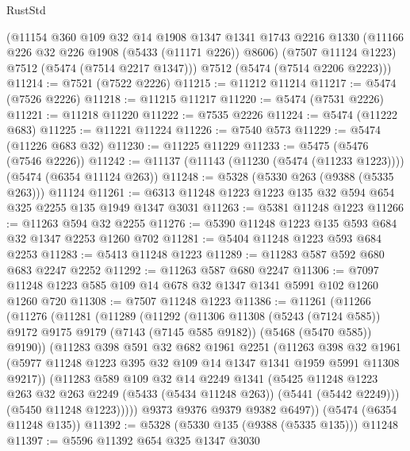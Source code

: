 \begin{lexlean}{RustStd}
\begin{coremodule}
      (@11154
        @360
        @109
        @32
        @14
        @1908
        @1347
        @1341
        @1743
        @2216
        @1330
        (@11166 @226 @32 @226 @1908 (@5433 (@11171 @226)) @8606)
        (@7507 @11124 @1223)
        @7512
        (@5474 (@7514 @2217 @1347)))
      @7512
      (@5474 (@7514 @2206 @2223)))
@11214 := @7521 (@7522 @2226)
@11215 := @11212 @11214
@11217 := @5474 (@7526 @2226)
@11218 := @11215 @11217
@11220 := @5474 (@7531 @2226)
@11221 := @11218 @11220
@11222 := @7535 @2226
@11224 := @5474 (@11222 @683)
@11225 := @11221 @11224
@11226 := @7540 @573
@11229 := @5474 (@11226 @683 @32)
@11230 := @11225 @11229
@11233 := @5475 (@5476 (@7546 @2226))
@11242 := @11137 (@11143 (@11230 (@5474 (@11233 @1223)))) (@5474 (@6354 @11124 @263))
@11248 := @5328 (@5330 @263 (@9388 (@5335 @263))) @11124
@11261 := @6313 @11248 @1223 @1223 @135 @32 @594 @654 @325 @2255 @135 @1949 @1347 @3031
@11263 := @5381 @11248 @1223
@11266 := @11263 @594 @32 @2255
@11276 := @5390 @11248 @1223 @135 @593 @684 @32 @1347 @2253 @1260 @702
@11281 := @5404 @11248 @1223 @593 @684 @2253
@11283 := @5413 @11248 @1223
@11289 := @11283 @587 @592 @680 @683 @2247 @2252
@11292 := @11263 @587 @680 @2247
@11306 := @7097 @11248 @1223 @585 @109 @14 @678 @32 @1347 @1341 @5991 @102 @1260 @1260 @720
@11308 := @7507 @11248 @1223
@11386 := @11261
    (@11266
      (@11276
        (@11281
          (@11289
            (@11292
              (@11306
                @11308
                (@5243 (@7124 @585))
                @9172
                @9175
                @9179
                (@7143 (@7145 @585 @9182))
                (@5468 (@5470 @585))
                @9190))
            (@11283
              @398
              @591
              @32
              @682
              @1961
              @2251
              (@11263
                @398
                @32
                @1961
                (@5977 @11248 @1223 @395 @32 @109 @14 @1347 @1341 @1959 @5991 @11308 @9217))
              (@11283
                @589
                @109
                @32
                @14
                @2249
                @1341
                (@5425
                  @11248
                  @1223
                  @263
                  @32
                  @263
                  @2249
                  (@5433 (@5434 @11248 @263))
                  (@5441 (@5442 @2249)))
                (@5450 @11248 @1223)))))
        @9373
        @9376
        @9379
        @9382
        @6497))
    (@5474 (@6354 @11248 @135))
@11392 := @5328 (@5330 @135 (@9388 (@5335 @135))) @11248
@11397 := @5596 @11392 @654 @325 @1347 @3030

\end{coremodule}
\end{lexlean}
